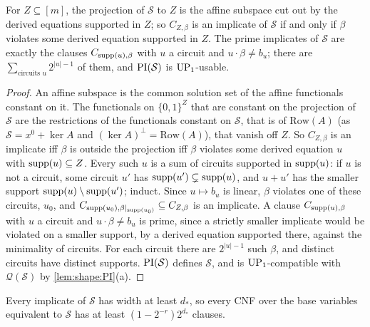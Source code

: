 \begin{proposition}\label{prop:shape:primeimpl}
For $Z\subseteq[m]$, the projection of $\mathcal S$ to $Z$ is the affine subspace cut out by the derived equations supported in $Z$; so $C_{Z,\beta}$ is an implicate of $\mathcal S$ if and only if $\beta$ violates some derived equation supported in $Z$. The prime implicates of $\mathcal S$ are exactly the clauses $C_{\operatorname{supp}(u),\beta}$ with $u$ a circuit and $u\cdot\beta\ne b_u$; there are $\sum_{\text{circuits }u}2^{\lvert u\rvert-1}$ of them, and $\mathrm{PI}(\mathcal S)$ is $\mathrm{UP}_1$-usable.
\end{proposition}

\begin{proof}
An affine subspace is the common solution set of the affine functionals constant on it. The functionals on $\{0,1\}^Z$ that are constant on the projection of $\mathcal S$ are the restrictions of the functionals constant on $\mathcal S$, that is of $\mathrm{Row}(A)$ (as $\mathcal S=x^0+\ker A$ and $(\ker A)^\perp=\mathrm{Row}(A)$), that vanish off $Z$. So $C_{Z,\beta}$ is an implicate iff $\beta$ is outside the projection iff $\beta$ violates some derived equation $u$ with $\operatorname{supp}(u)\subseteq Z$. Every such $u$ is a sum of circuits supported in $\operatorname{supp}(u)$: if $u$ is not a circuit, some circuit $u'$ has $\operatorname{supp}(u')\subsetneq\operatorname{supp}(u)$, and $u+u'$ has the smaller support $\operatorname{supp}(u)\setminus\operatorname{supp}(u')$; induct. Since $u\mapsto b_u$ is linear, $\beta$ violates one of these circuits, $u_0$, and $C_{\operatorname{supp}(u_0),\beta|_{\operatorname{supp}(u_0)}}\subseteq C_{Z,\beta}$ is an implicate. A clause $C_{\operatorname{supp}(u),\beta}$ with $u$ a circuit and $u\cdot\beta\ne b_u$ is prime, since a strictly smaller implicate would be violated on a smaller support, by a derived equation supported there, against the minimality of circuits. For each circuit there are $2^{\lvert u\rvert-1}$ such $\beta$, and distinct circuits have distinct supports. $\mathrm{PI}(\mathcal S)$ defines $\mathcal S$, and is $\mathrm{UP}_1$-compatible with $\mathcal Q(\mathcal S)$ by \cref{lem:shape:PI}(a).
\end{proof}

\begin{proposition}\label{prop:shape:cnf}
Every implicate of $\mathcal S$ has width at least $d_*$, so every CNF over the base variables equivalent to $\mathcal S$ has at least $(1-2^{-r})2^{d_*}$ clauses.
\end{proposition}

